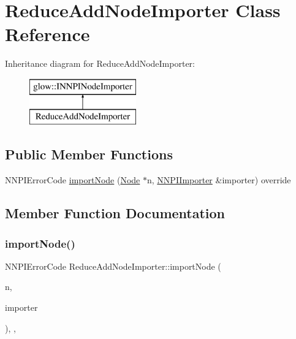 \hypertarget{class_reduce_add_node_importer}{}\section{Reduce\+Add\+Node\+Importer Class Reference}
\label{class_reduce_add_node_importer}
Inheritance diagram for Reduce\+Add\+Node\+Importer\+:\begin{figure}[H]
\begin{center}
\leavevmode
\includegraphics[height=2.000000cm]{class_reduce_add_node_importer}
\end{center}
\end{figure}
\subsection*{Public Member Functions}
\begin{DoxyCompactItemize}
\item 
N\+N\+P\+I\+Error\+Code \hyperlink{class_reduce_add_node_importer_a0e9370afd7644e3438089b5fb400fb41}{import\+Node} (\hyperlink{classglow_1_1_node}{Node} $\ast$n, \hyperlink{classglow_1_1_n_n_p_i_importer}{N\+N\+P\+I\+Importer} \&importer) override
\end{DoxyCompactItemize}


\subsection{Member Function Documentation}
\mbox{\label{class_reduce_add_node_importer_a0e9370afd7644e3438089b5fb400fb41}} 
\subsubsection{\texorpdfstring{import\+Node()}{importNode()}}
{\footnotesize\ttfamily N\+N\+P\+I\+Error\+Code Reduce\+Add\+Node\+Importer\+::import\+Node (\begin{DoxyParamCaption}\item[{\hyperlink{classglow_1_1_node}{Node} $\ast$}]{n,  }\item[{\hyperlink{classglow_1_1_n_n_p_i_importer}{N\+N\+P\+I\+Importer} \&}]{importer }\end{DoxyParamCaption})\hspace{0.3cm}{\ttfamily [inline]}, {\ttfamily [override]}, {\ttfamily [virtual]}}


